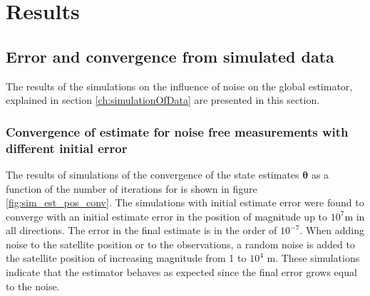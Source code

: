 
\chapter{Results}
\section{Error and convergence from simulated data} \label{simDataError}
The results of the simulations on the influence of noise on the global estimator, explained in section \ref{ch:simulationOfData} are presented in this section.
\subsection{Convergence of estimate for noise free measurements with different initial error}
The results of simulations of the convergence of the state estimates $\boldsymbol \theta$ as a function of the number of iterations for is shown in figure \ref{fig:sim_est_pos_conv}.
The simulations with initial estimate error were found to converge with an initial estimate error in the position of magnitude up to $10^7$m in all directions. The error in the final estimate is in the order of $10^{-7}$. 
When adding noise to the satellite position or to the observations, a random noise is added to the satellite position of increasing magnitude from 1 to $10^4$ m. These simulations indicate that the estimator behaves as expected since the final error grows equal to the noise.
\par 
